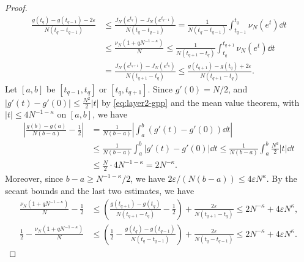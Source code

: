 \begin{proof}
\begin{align*}
 \frac{g(t_q)-g(t_{q-1})-2\varepsilon}{N(t_q-t_{q-1})}
 &\le\frac{J_N(e^{t_q})-J_N(e^{t_{q-1}})}{N(t_q-t_{q-1})}
 =\frac1{N(t_q-t_{q-1})}\int_{t_{q-1}}^{t_q}\nu_N(e^t)\dd t\\
 &\le\frac{\nu_N(1+qN^{-1-\kappa})}N
 \le\frac1{N(t_{q+1}-t_q)}\int_{t_q}^{t_{q+1}}\nu_N(e^t)\dd t\\
 &=\frac{J_N(e^{t_{q+1}})-J_N(e^{t_q})}{N(t_{q+1}-t_q)}
 \le\frac{g(t_{q+1})-g(t_q)+2\varepsilon}{N(t_{q+1}-t_q)}.
\end{align*}
Let $[a,b]$ be $[t_{q-1},t_q]$ or $[t_q,t_{q+1}]$. Since $g'(0)=N/2$, and
$|g'(t)-g'(0)|\le\frac{N^2}2|t|$ by \eqref{eq:layer2-gpp} and the mean
value theorem, with $|t|\le4N^{-1-\kappa}$ on $[a,b]$, we have
\begin{align*}
 \left|\frac{g(b)-g(a)}{N(b-a)}-\frac12\right|
 &=\frac1{N(b-a)}\left|\int_a^b(g'(t)-g'(0))\dd t\right|\\
 &\le\frac1{N(b-a)}\int_a^b|g'(t)-g'(0)|\dd t
 \le\frac1{N(b-a)}\int_a^b\frac{N^2}2|t|\dd t\\
 &\le\frac N2\cdot4N^{-1-\kappa}
 =2N^{-\kappa}.
\end{align*}
Moreover, since $b-a\ge N^{-1-\kappa}/2$, we have
$2\varepsilon/(N(b-a))\le4\varepsilon N^\kappa$. By the secant bounds and
the last two estimates, we have
\begin{align*}
 \frac{\nu_N(1+qN^{-1-\kappa})}N-\frac12
 &\le\left(\frac{g(t_{q+1})-g(t_q)}{N(t_{q+1}-t_q)}-\frac12\right)
   +\frac{2\varepsilon}{N(t_{q+1}-t_q)}
 \le2N^{-\kappa}+4\varepsilon N^{\kappa},\\
 \frac12-\frac{\nu_N(1+qN^{-1-\kappa})}N
 &\le\left(\frac12-\frac{g(t_q)-g(t_{q-1})}{N(t_q-t_{q-1})}\right)
   +\frac{2\varepsilon}{N(t_q-t_{q-1})}
 \le2N^{-\kappa}+4\varepsilon N^{\kappa}.
\end{align*}
\end{proof}

